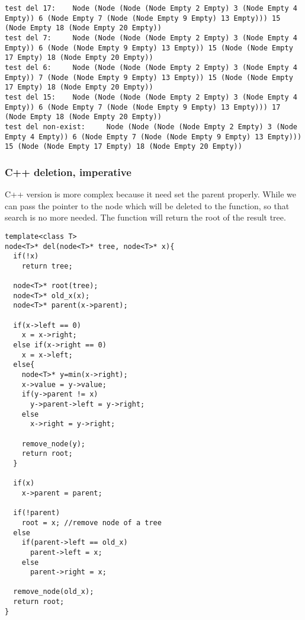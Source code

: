 \documentclass{article}
\begin{document}
\begin{verbatim}
test del 17:    Node (Node (Node (Node Empty 2 Empty) 3 (Node Empty 4 
Empty)) 6 (Node Empty 7 (Node (Node Empty 9 Empty) 13 Empty))) 15 
(Node Empty 18 (Node Empty 20 Empty))
test del 7:     Node (Node (Node (Node Empty 2 Empty) 3 (Node Empty 4 
Empty)) 6 (Node (Node Empty 9 Empty) 13 Empty)) 15 (Node (Node Empty 
17 Empty) 18 (Node Empty 20 Empty))
test del 6:     Node (Node (Node (Node Empty 2 Empty) 3 (Node Empty 4 
Empty)) 7 (Node (Node Empty 9 Empty) 13 Empty)) 15 (Node (Node Empty 
17 Empty) 18 (Node Empty 20 Empty))
test del 15:    Node (Node (Node (Node Empty 2 Empty) 3 (Node Empty 4 
Empty)) 6 (Node Empty 7 (Node (Node Empty 9 Empty) 13 Empty))) 17 
(Node Empty 18 (Node Empty 20 Empty))
test del non-exist:     Node (Node (Node (Node Empty 2 Empty) 3 (Node 
Empty 4 Empty)) 6 (Node Empty 7 (Node (Node Empty 9 Empty) 13 Empty))) 
15 (Node (Node Empty 17 Empty) 18 (Node Empty 20 Empty))
\end{verbatim}

\subsubsection*{C++ deletion, imperative}

C++ version is more complex because it need set the parent properly.
While we can pass the pointer to the node which will be deleted to the function,
so that search is no more needed. The function will return the root
of the result tree.

\lstset{language=C++}
\begin{lstlisting}
template<class T>
node<T>* del(node<T>* tree, node<T>* x){
  if(!x)
    return tree;

  node<T>* root(tree);
  node<T>* old_x(x);
  node<T>* parent(x->parent);

  if(x->left == 0)
    x = x->right;
  else if(x->right == 0)
    x = x->left;
  else{
    node<T>* y=min(x->right);
    x->value = y->value;
    if(y->parent != x)
      y->parent->left = y->right;
    else
      x->right = y->right;

    remove_node(y);
    return root;
  }

  if(x)
    x->parent = parent;

  if(!parent)
    root = x; //remove node of a tree
  else
    if(parent->left == old_x)
      parent->left = x;
    else
      parent->right = x;

  remove_node(old_x);
  return root;
}
\end{lstlisting}
\end{document}
